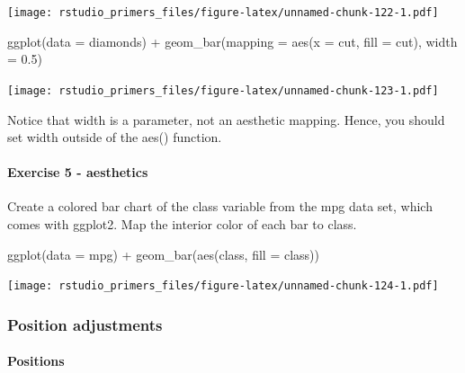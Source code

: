 \documentclass[
]{article}
\newenvironment{Shaded}{\begin{snugshade}}{\end{snugshade}}
\newcommand{\AttributeTok}[1]{\textcolor[rgb]{0.77,0.63,0.00}{#1}}
\newcommand{\FloatTok}[1]{\textcolor[rgb]{0.00,0.00,0.81}{#1}}
\newcommand{\FunctionTok}[1]{\textcolor[rgb]{0.00,0.00,0.00}{#1}}
\newcommand{\NormalTok}[1]{#1}
\newcommand{\SpecialCharTok}[1]{\textcolor[rgb]{0.00,0.00,0.00}{#1}}
\begin{document}
\texttt{[image: rstudio\_primers\_files/figure-latex/unnamed-chunk-122-1.pdf]}

\begin{Shaded}
\begin{Highlighting}[]
\FunctionTok{ggplot}\NormalTok{(}\AttributeTok{data =}\NormalTok{ diamonds) }\SpecialCharTok{+}
  \FunctionTok{geom\_bar}\NormalTok{(}\AttributeTok{mapping =} \FunctionTok{aes}\NormalTok{(}\AttributeTok{x =}\NormalTok{ cut, }\AttributeTok{fill =}\NormalTok{ cut), }\AttributeTok{width =} \FloatTok{0.5}\NormalTok{)}
\end{Highlighting}
\end{Shaded}

\texttt{[image: rstudio\_primers\_files/figure-latex/unnamed-chunk-123-1.pdf]}

Notice that width is a parameter, not an aesthetic mapping. Hence, you
should set width outside of the aes() function.

\hypertarget{exercise-5---aesthetics}{%
\paragraph{Exercise 5 - aesthetics}\label{exercise-5---aesthetics}}

Create a colored bar chart of the class variable from the mpg data set,
which comes with ggplot2. Map the interior color of each bar to class.

\begin{Shaded}
\begin{Highlighting}[]
\FunctionTok{ggplot}\NormalTok{(}\AttributeTok{data =}\NormalTok{ mpg) }\SpecialCharTok{+} 
  \FunctionTok{geom\_bar}\NormalTok{(}\FunctionTok{aes}\NormalTok{(class, }\AttributeTok{fill =}\NormalTok{ class))}
\end{Highlighting}
\end{Shaded}

\texttt{[image: rstudio\_primers\_files/figure-latex/unnamed-chunk-124-1.pdf]}

\hypertarget{position-adjustments}{%
\subsubsection{Position adjustments}\label{position-adjustments}}

\hypertarget{positions}{%
\paragraph{Positions}\label{positions}}
\end{document}
